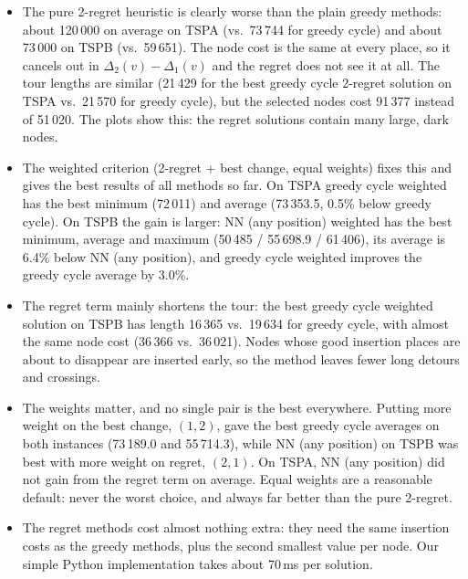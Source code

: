 \documentclass[11pt,a4paper]{article}
\begin{document}
\begin{itemize}
  \item The pure 2-regret heuristic is clearly worse than the plain greedy methods: about 120\,000
        on average on TSPA (vs.\ 73\,744 for greedy cycle) and about 73\,000 on TSPB (vs.\ 59\,651).
        The node cost is the same at every place, so it cancels out in
        $\Delta_2(v) - \Delta_1(v)$ and the regret does not see it at all. The tour lengths are
        similar (21\,429 for the best greedy cycle 2-regret solution on TSPA vs.\ 21\,570 for
        greedy cycle), but the selected nodes cost 91\,377 instead of 51\,020. The plots show this:
        the regret solutions contain many large, dark nodes.
  \item The weighted criterion (2-regret + best change, equal weights) fixes this and gives the best
        results of all methods so far. On TSPA greedy cycle weighted has the best minimum (72\,011)
        and average (73\,353.5, 0.5\% below greedy cycle). On TSPB the gain is larger: NN (any
        position) weighted has the best minimum, average and maximum (50\,485 / 55\,698.9 /
        61\,406), its average is 6.4\% below NN (any position), and greedy cycle weighted improves
        the greedy cycle average by 3.0\%.
  \item The regret term mainly shortens the tour: the best greedy cycle weighted solution on TSPB has
        length 16\,365 vs.\ 19\,634 for greedy cycle, with almost the same node cost (36\,366 vs.\
        36\,021). Nodes whose good insertion places are about to disappear are inserted early, so
        the method leaves fewer long detours and crossings.
  \item The weights matter, and no single pair is the best everywhere. Putting more weight on the
        best change, $(1, 2)$, gave the best greedy cycle averages on both instances (73\,189.0 and
        55\,714.3), while NN (any position) on TSPB was best with more weight on regret, $(2, 1)$.
        On TSPA, NN (any position) did not gain from the regret term on average. Equal weights are a
        reasonable default: never the worst choice, and always far better than the pure 2-regret.
  \item The regret methods cost almost nothing extra: they need the same insertion costs as the
        greedy methods, plus the second smallest value per node. Our simple Python implementation
        takes about 70\,ms per solution.
\end{itemize}
\end{document}
